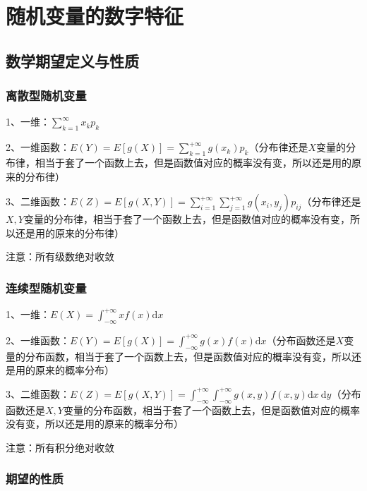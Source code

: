 \chapter{随机变量的数字特征}

\section{数学期望定义与性质}



\subsection{离散型随机变量}

1、一维：$\sum_{k=1}^{\infty}x_kp_k$

2、一维函数：$E(Y)=E[g(X)]=\sum_{k=1}^{+\infty} g\left(x_{k}\right) p_{k}$（分布律还是$X$变量的分布律，相当于套了一个函数上去，但是函数值对应的概率没有变，所以还是用的原来的分布律）

3、二维函数：$E(Z)=E[g(X, Y)]=\sum_{i=1}^{+\infty} \sum_{j=1}^{+\infty} g\left(x_{i}, y_{j}\right) p_{i j}$（分布律还是$X,Y$变量的分布律，相当于套了一个函数上去，但是函数值对应的概率没有变，所以还是用的原来的分布律）

注意：所有级数绝对收敛



\subsection{连续型随机变量}

1、一维：$E(X)=\int_{-\infty}^{+\infty} x f(x) \mathrm{d} x$

2、一维函数：$E(Y)=E[g(X)]=\int_{-\infty}^{+\infty} g(x) f(x) \mathrm{d} x$（分布函数还是$X$变量的分布函数，相当于套了一个函数上去，但是函数值对应的概率没有变，所以还是用的原来的概率分布）

3、二维函数：$E(Z)=E[g(X, Y)]=\int_{-\infty}^{+\infty} \int_{-\infty}^{+\infty} g(x, y) f(x, y) \mathrm{d} x \mathrm{~d} y$（分布函数还是$X,Y$变量的分布函数，相当于套了一个函数上去，但是函数值对应的概率没有变，所以还是用的原来的概率分布）

注意：所有积分绝对收敛



\subsection{期望的性质}


